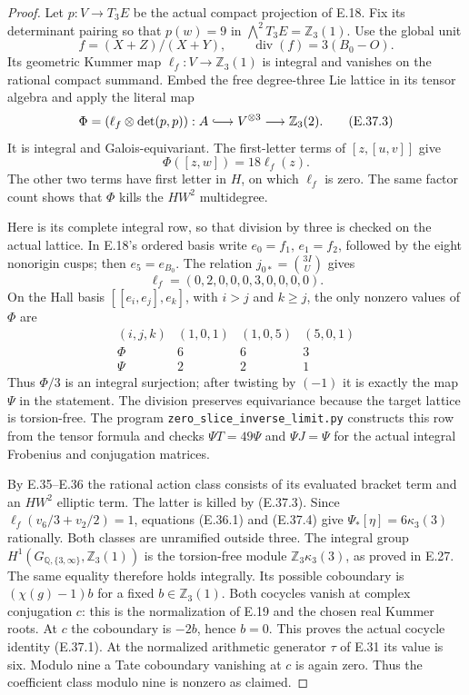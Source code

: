 \begin{proof}
Let $p:V\to T_3E$ be the actual compact
projection of E.18. Fix its determinant
pairing so that $p(w)=9$ in
$\bigwedge^2T_3E=\mathbb Z_3(1)$.
Use the global unit
\[
                 f=(X+Z)/(X+Y),
       \qquad\operatorname{div}(f)=3(B_0-O).
\]
Its geometric Kummer map
$\ell_f:V\to\mathbb Z_3(1)$ is integral
and vanishes on the rational compact
summand. Embed the free degree-three
Lie lattice in its tensor algebra and
apply the literal map
\[
 \Phi=(\ell_f\otimes\det(p,p)):
    A\lhook\joinrel\longrightarrow V^{\otimes3}
       \longrightarrow\mathbb Z_3(2).
 \tag{E.37.3}
\]
It is integral and Galois-equivariant.
The first-letter terms of $[z,[u,v]]$
give
\[
                  \Phi([z,w])=18\ell_f(z).
 \tag{E.37.4}
\]
The other two terms have first letter in
$H$, on which $\ell_f$ is zero. The same
factor count shows that $\Phi$ kills the
$HW^2$ multidegree.

Here is its complete integral row, so
that division by three is checked on
the actual lattice. In E.18's ordered
basis write $e_0=f_1$, $e_1=f_2$,
followed by the eight nonorigin cusps;
then $e_5=e_{B_0}$. The relation
$j_{0*}=\binom{3I}{U}$ gives
\[
 \ell_f=(0,2,0,0,0,3,0,0,0,0).
\]
On the Hall basis $[[e_i,e_j],e_k]$,
with $i>j$ and $k\ge j$, the only nonzero
values of $\Phi$ are
\[
 \begin{array}{c|rrr}
 (i,j,k)&(1,0,1)&(1,0,5)&(5,0,1)\\\hline
 \Phi&6&6&3\\
 \Psi&2&2&1
 \end{array}
 \tag{E.37.5}
\]
Thus $\Phi/3$ is an integral surjection;
after twisting by $(-1)$ it is exactly
the map $\Psi$ in the statement. The
division preserves equivariance because
the target lattice is torsion-free.
The program
\texttt{zero\_slice\_inverse\_limit.py}
constructs this row from the tensor
formula and checks $\Psi T=49\Psi$ and
$\Psi J=\Psi$ for the actual integral
Frobenius and conjugation matrices.

By E.35--E.36 the rational action class
consists of its evaluated bracket term
and an $HW^2$ elliptic term. The latter
is killed by (E.37.3). Since
$\ell_f(v_6/3+v_2/2)=1$, equations
(E.36.1) and (E.37.4) give
$\Psi_*[\eta]=6\kappa_3(3)$ rationally.
Both classes are unramified outside
three. The integral group
$H^1(G_{\mathbb Q,\{3,\infty\}},\mathbb Z_3(1))$
is the torsion-free module
$\mathbb Z_3\kappa_3(3)$, as proved in
E.27. The same equality therefore holds
integrally. Its possible coboundary is
$(\chi(g)-1)b$ for a fixed $b\in\mathbb Z_3(1)$.
Both cocycles vanish at complex
conjugation $c$: this is the normalization
of E.19 and the chosen real Kummer roots.
At $c$ the coboundary is $-2b$, hence
$b=0$. This proves the actual cocycle
identity (E.37.1).
At the normalized arithmetic generator
$\tau$ of E.31 its value is six.
Modulo nine a Tate coboundary vanishing
at $c$ is again zero. Thus the coefficient
class modulo nine is nonzero as claimed.


\end{proof}
